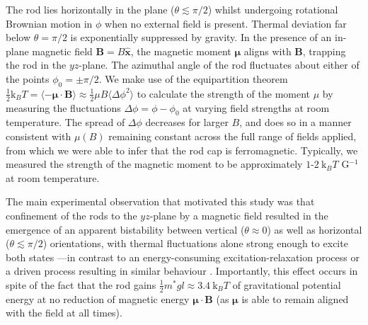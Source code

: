 \documentclass[aps,prl,twocolumn,superscriptaddress]{revtex4-1}
\newcommand{\vcrm}[1]{\mathbf{#1}}
\newcommand{\hvcrm}[1]{\mathbf{\hat{#1}}}
\newcommand{\vc}[1]{\boldsymbol{#1}}
\newcommand{\kk}{\mathrm{k}_B}
\begin{document}
The rod lies horizontally in the plane ($\theta\lesssim\pi/2$) whilst undergoing rotational Brownian motion in $\phi$ when no external field is present. Thermal deviation far below $\theta=\pi/2$ is exponentially suppressed by gravity. In the presence of an in-plane magnetic field $\vcrm{B}=B \hvcrm{x}$, the magnetic moment $\vc{\mu}$ aligns with $\vcrm{B}$, trapping the rod in the $yz$-plane. The azimuthal angle of the rod fluctuates about either of the points $\phi_0=\pm\pi/2$. We make use of the equipartition theorem $ \frac{1}{2}\kk T = \langle -\vc{\mu}\cdot\vcrm{B}\rangle \approx \frac{1}{2}\mu B \langle \Delta\phi^2 \rangle $ to calculate the strength of the moment $\mu$ by measuring the fluctuations $\Delta\phi=\phi-\phi_0$ at varying field strengths at room temperature. The spread of $\Delta\phi$ decreases for larger $B$, and does so in a manner consistent with $\mu(B)$ remaining constant across the full range of fields applied, from which we were able to infer that the rod cap is ferromagnetic. Typically, we measured the strength of the magnetic moment to be approximately $1$-$2\ \kk T $ G$^{-1}$ at room temperature.

The main experimental observation that motivated this study was that confinement of the rods to the $yz$-plane by a magnetic field resulted in the emergence of an apparent bistability between vertical ($\theta \approx 0$) as well as horizontal ($\theta \lesssim \pi/2$) orientations, with thermal fluctuations alone strong enough to excite both states ---in contrast to an energy-consuming excitation-relaxation process or a driven process resulting in similar behaviour \cite{Dhar2007}. Importantly, this effect occurs in spite of the fact that the rod gains $\frac{1}{2}m^* g l \approx 3.4 \ \kk T$ of gravitational potential energy at no reduction of magnetic energy $\vc{\mu}\cdot \vcrm{B}$ (as $\vc{\mu}$ is able to remain aligned with the field at all times).

\end{document}
